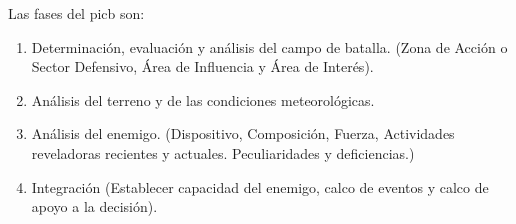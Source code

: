 Las fases del \gls{picb} son:

\begin{enumerate}
\item Determinación, evaluación y análisis del campo de batalla. (Zona de Acción o Sector Defensivo, Área de Influencia y Área de Interés).
\item Análisis del terreno  y de las  condiciones meteorológicas.
\item Análisis del enemigo. (Dispositivo, Composición, Fuerza, Actividades reveladoras recientes y actuales. Peculiaridades y deficiencias.)
\item Integración (Establecer capacidad del enemigo, calco de eventos y calco de apoyo a la decisión).
\end{enumerate}




